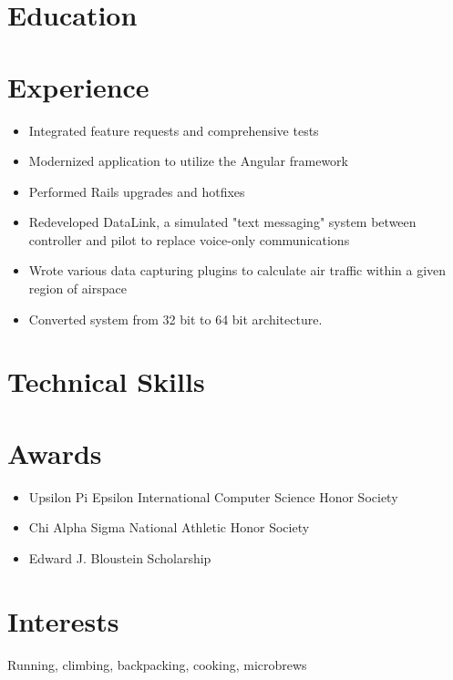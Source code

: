 \documentclass[11pt,a4paper,sans]{moderncv}        %
\begin{document}
\makecvtitle

\section{Education}


\section{Experience}

\begin{itemize}
\item Integrated feature requests and comprehensive tests
\item Modernized application to utilize the Angular framework
\item Performed Rails upgrades and hotfixes
\end{itemize}


\begin{itemize}
\item Redeveloped DataLink, a simulated "text messaging" system between controller and pilot to replace voice-only communications
\item Wrote various data capturing plugins to calculate air traffic within a given region of airspace
\item Converted system from 32 bit to 64 bit architecture.
\end{itemize}

\section{Technical Skills}
	
\section{Awards}
\begin{itemize}
\item Upsilon Pi Epsilon International Computer Science Honor Society
\item Chi Alpha Sigma National Athletic Honor Society
\item Edward J. Bloustein Scholarship
\end{itemize}

\section{Interests}
Running, climbing, backpacking, cooking, microbrews


\clearpage
\end{document}

